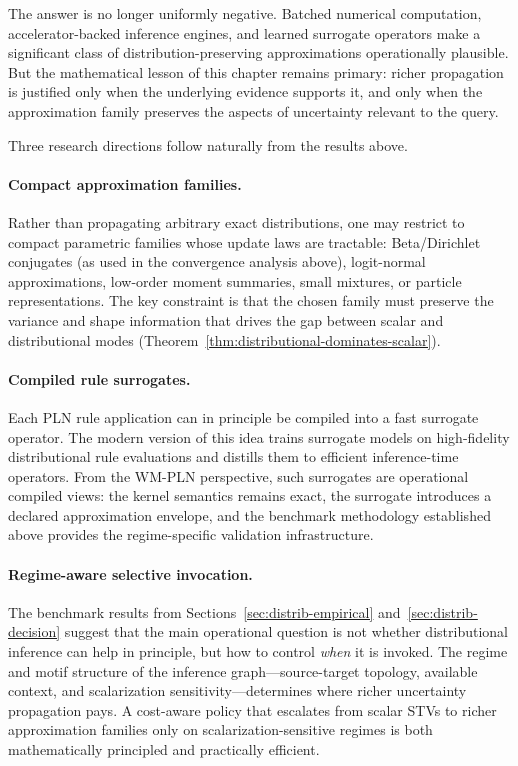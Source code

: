 \documentclass[11pt,openany]{report}
\begin{document}
The answer is no longer uniformly negative.  Batched numerical computation,
accelerator-backed inference engines, and learned surrogate operators make a
significant class of distribution-preserving approximations operationally
plausible.  But the mathematical lesson of this chapter remains primary:
richer propagation is justified only when the underlying evidence supports it,
and only when the approximation family preserves the aspects of uncertainty
relevant to the query.

Three research directions follow naturally from the results above.

\paragraph{Compact approximation families.}
Rather than propagating arbitrary exact distributions, one may restrict to
compact parametric families whose update laws are tractable: Beta/Dirichlet
conjugates (as used in the convergence analysis above), logit-normal approximations,
low-order moment summaries, small mixtures, or particle representations.
The key constraint is that the chosen family must preserve the variance
and shape information that drives the gap between scalar and distributional
modes (Theorem~\ref{thm:distributional-dominates-scalar}).

\paragraph{Compiled rule surrogates.}
Each PLN rule application can in principle be compiled into a fast surrogate
operator.  The modern version of this idea trains surrogate models on
high-fidelity distributional rule evaluations and distills them to efficient
inference-time operators.  From the WM-PLN perspective, such surrogates are
operational compiled views: the kernel semantics remains exact, the surrogate
introduces a declared approximation envelope, and the benchmark methodology
established above provides the regime-specific validation infrastructure.

\paragraph{Regime-aware selective invocation.}
The benchmark results from Sections~\ref{sec:distrib-empirical}
and~\ref{sec:distrib-decision} suggest that the main
operational question is not whether distributional inference can help in
principle, but how to control \emph{when} it is invoked.  The regime
and motif structure of the inference graph---source-target topology,
available context, and scalarization sensitivity---determines where richer
uncertainty propagation pays.  A cost-aware policy that escalates from
scalar STVs to richer approximation families only on
scalarization-sensitive regimes is both mathematically principled and
practically efficient.
\end{document}
